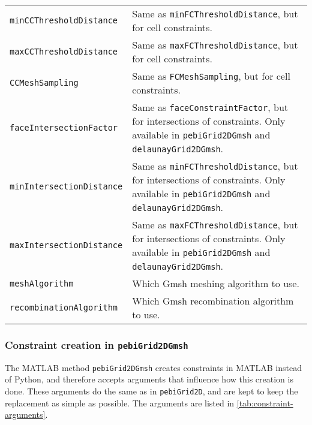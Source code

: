 \begin{tabularx}{\textwidth}{l X}
    \texttt{minCCThresholdDistance} & Same as \texttt{minFCThresholdDistance}, but for cell constraints. \\
    \texttt{maxCCThresholdDistance} & Same as \texttt{maxFCThresholdDistance}, but for cell constraints. \\
    \texttt{CCMeshSampling} & Same as \texttt{FCMeshSampling}, but for cell constraints. \\
    \texttt{faceIntersectionFactor} & Same as \texttt{faceConstraintFactor}, but for intersections of constraints. Only available in \texttt{pebiGrid2DGmsh} and \texttt{delaunayGrid2DGmsh}. \\
    \texttt{minIntersectionDistance} & Same as \texttt{minFCThresholdDistance}, but for intersections of constraints. Only available in \texttt{pebiGrid2DGmsh} and \texttt{delaunayGrid2DGmsh}. \\
    \texttt{maxIntersectionDistance} & Same as \texttt{maxFCThresholdDistance}, but for intersections of constraints. Only available in \texttt{pebiGrid2DGmsh} and \texttt{delaunayGrid2DGmsh}. \\
    \texttt{meshAlgorithm} & Which Gmsh meshing algorithm to use. \\
    \texttt{recombinationAlgorithm} & Which Gmsh recombination algorithm to use. \\
\end{tabularx}



\subsubsection{Constraint creation in \texttt{pebiGrid2DGmsh}}
The MATLAB method \verb|pebiGrid2DGmsh| creates constraints in MATLAB instead of Python, and therefore accepts arguments that influence how this creation is done. These arguments do the same as in \verb|pebiGrid2D|, and are kept to keep the replacement as simple as possible. The arguments are listed in \autoref{tab:constraint-arguments}.

